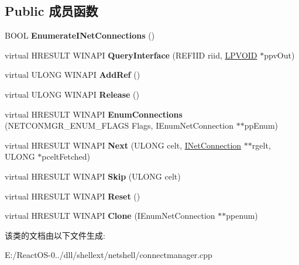 \subsection*{Public 成员函数}
\begin{DoxyCompactItemize}
\item 
\mbox{\label{class_c_net_connection_manager_aad3cbcf0a7e10d45906b9f31e9d2916d}} 
B\+O\+OL {\bfseries Enumerate\+I\+Net\+Connections} ()
\item 
\mbox{\label{class_c_net_connection_manager_a6f6824a3ec06e901c6b3d968b4ba2215}} 
virtual H\+R\+E\+S\+U\+LT W\+I\+N\+A\+PI {\bfseries Query\+Interface} (R\+E\+F\+I\+ID riid, \hyperlink{interfacevoid}{L\+P\+V\+O\+ID} $\ast$ppv\+Out)
\item 
\mbox{\label{class_c_net_connection_manager_a7cc78f3d214784c48d584aa927de5b6b}} 
virtual U\+L\+O\+NG W\+I\+N\+A\+PI {\bfseries Add\+Ref} ()
\item 
\mbox{\label{class_c_net_connection_manager_a01256abd82244a106b0156ae2ae76526}} 
virtual U\+L\+O\+NG W\+I\+N\+A\+PI {\bfseries Release} ()
\item 
\mbox{\label{class_c_net_connection_manager_ae28888c70e467f59f2c1abd0727e5778}} 
virtual H\+R\+E\+S\+U\+LT W\+I\+N\+A\+PI {\bfseries Enum\+Connections} (N\+E\+T\+C\+O\+N\+M\+G\+R\+\_\+\+E\+N\+U\+M\+\_\+\+F\+L\+A\+GS Flags, I\+Enum\+Net\+Connection $\ast$$\ast$pp\+Enum)
\item 
\mbox{\label{class_c_net_connection_manager_a982ec1601290933a5a779b1bf7018ca6}} 
virtual H\+R\+E\+S\+U\+LT W\+I\+N\+A\+PI {\bfseries Next} (U\+L\+O\+NG celt, \hyperlink{interface_i_net_connection}{I\+Net\+Connection} $\ast$$\ast$rgelt, U\+L\+O\+NG $\ast$pcelt\+Fetched)
\item 
\mbox{\label{class_c_net_connection_manager_a6ed3075c9293e6acf1ec6a2a5485c15c}} 
virtual H\+R\+E\+S\+U\+LT W\+I\+N\+A\+PI {\bfseries Skip} (U\+L\+O\+NG celt)
\item 
\mbox{\label{class_c_net_connection_manager_a8f8e389243fe27ad0d76ce6ebf2c9a64}} 
virtual H\+R\+E\+S\+U\+LT W\+I\+N\+A\+PI {\bfseries Reset} ()
\item 
\mbox{\label{class_c_net_connection_manager_aabc0ac398140dc587ce12c1f3f2b2bec}} 
virtual H\+R\+E\+S\+U\+LT W\+I\+N\+A\+PI {\bfseries Clone} (I\+Enum\+Net\+Connection $\ast$$\ast$ppenum)
\end{DoxyCompactItemize}


该类的文档由以下文件生成\+:\begin{DoxyCompactItemize}
\item 
E\+:/\+React\+O\+S-\/0../dll/shellext/netshell/connectmanager.\+cpp\end{DoxyCompactItemize}
